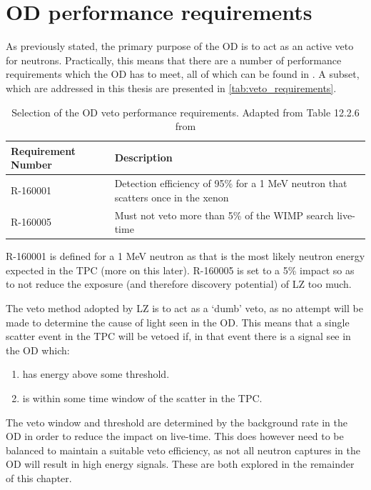 \section{OD performance requirements}
\label{sec:simulated_od_requirements}
\par
As previously stated, the primary purpose of the OD is to act as an active veto for neutrons.
Practically, this means that there are a number of performance requirements which the OD has to meet, all of which can be found in \cite{LZ_TechnicalDesignReview_ref}.
A subset, which are addressed in this thesis are presented in \autoref{tab:veto_requirements}.
\begin{table}[!htbp]
    \centering
    \begin{tabular}{p{}p{}} %
    \hline
    {Requirement Number} & {Description} \\ \hline
    R-160001             & Detection efficiency of 95\% for a 1 MeV neutron that scatters once in the xenon \\
    R-160005             & Must not veto more than 5\% of the WIMP search live-time
    \end{tabular}
    \caption{Selection of the OD veto performance requirements. Adapted from Table 12.2.6 from \cite{LZ_TechnicalDesignReview_ref}}
    \label{tab:veto_requirements}
\end{table} 
R-160001 is defined for a 1 MeV neutron as that is the most likely neutron energy expected in the TPC (more on this later).
R-160005 is set to a 5\% impact so as to not reduce the exposure (and therefore discovery potential) of LZ too much.

\par
The veto method adopted by LZ is to act as a `dumb' veto, as no attempt will be made to determine the cause of light seen in the OD.
This means that a single scatter event in the TPC will be vetoed if, in that event there is a signal see in the OD which:
\begin{enumerate}
    \item has energy above some threshold.
    \item is within some time window of the scatter in the TPC. 
\end{enumerate}
The veto window and threshold are determined by the background rate in the OD in order to reduce the impact on live-time.
This does however need to be balanced to maintain a suitable veto efficiency, as not all neutron captures in the OD will result in high energy signals.
These are both explored in the remainder of this chapter.

